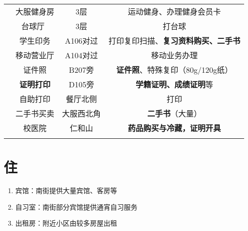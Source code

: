 \begin{table}[H]
\begin{tabular}{|c|c|c|c|}
        \cline{2-4}
                              & 大服健身房\footnotemark           & 3层                    %
                              & 运动健身、办理健身会员卡                                         \\
        \cline{2-4}
                              & 台球厅\                         & 3层     & 打台球          \\
        \Xhline{1.2pt}
        \multirow{3}{*}{中和广场} & 学生印务                         & A106对过                %
                              & 打印复印扫描、\textbf{复习资料购买、二手书}                           \\
        \cline{2-4}
                              & 移动营业厅                        & A104对过 & 移动业务办理       \\
        \Xhline{1.2pt}
        \multirow{4}{*}{其他}   & 证件照                          & B207旁                 %
                              & \textbf{证件照}、特殊复印（80g/120g纸）                         \\
        \cline{2-4}
                              & \textbf{证明打印}                & D105旁                 %
                              & \textbf{学籍证明、成绩证明}等                                  \\
        \cline{2-4}
                              & 自助打印                         & 餐厅北侧   & 打印           \\
        \cline{2-4}
                              & 二手书买卖                        & 大服西北角                 %
                              & \textbf{二手书}（大量）                                     \\
        \cline{2-4}
                              & 校医院                          & 仁和山                   %
                              & \textbf{药品购买与冷藏，证明开具}                                \\
        \Xhline{1.2pt}
    \end{tabular}
\end{table}

\section[住]{住}
\begin{enumerate}
    \item 宾馆：南街提供大量宾馆、客房等
    \item 自习室：南街部分宾馆提供通宵自习服务
    \item 出租房：附近小区由较多房屋出租\footnotemark
\end{enumerate}


